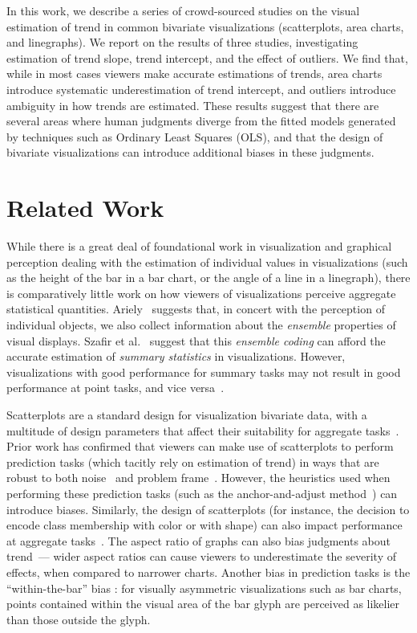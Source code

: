 \documentclass[chi_draft]{sigchi}
\begin{document}
In this work, we describe a series of crowd-sourced studies on the visual estimation of trend in common bivariate visualizations (scatterplots, area charts, and linegraphs). We report on the results of three studies, investigating estimation of trend slope, trend intercept, and the effect of outliers. We find that, while in most cases viewers make accurate estimations of trends, area charts introduce systematic underestimation of trend intercept, and outliers introduce ambiguity in how trends are estimated. These results suggest that there are several areas where human judgments diverge from the fitted models generated by techniques such as Ordinary Least Squares (OLS), and that the design of bivariate visualizations can introduce additional biases in these judgments.

\section{Related Work}

While there is a great deal of foundational work in visualization and graphical perception dealing with the estimation of individual values in visualizations (such as the height of the bar in a bar chart, or the angle of a line in a linegraph), there is comparatively little work on how viewers of visualizations perceive aggregate statistical quantities. Ariely~\cite{ariely2001seeing} suggests that, in concert with the perception of individual objects, we also collect information about the \emph{ensemble} properties of visual displays. Szafir et al.~\cite{szafir2016four} suggest that this \emph{ensemble coding} can afford the accurate estimation of \emph{summary statistics} in visualizations. However, visualizations with good performance for summary tasks may not result in good performance at point tasks, and vice versa~\cite{albers2014task,fuchs2013evaluation}. 

Scatterplots are a standard design for visualization bivariate data, with a multitude of design parameters that affect their suitability for aggregate tasks~\cite{cleveland1984many}. Prior work has confirmed that viewers can make use of scatterplots to perform prediction tasks (which tacitly rely on estimation of trend) in ways that are robust to both noise~\cite{harvey1997effects} and problem frame~\cite{lewandowsky2011popular}. However, the heuristics used when performing these prediction tasks (such as the anchor-and-adjust method~\cite{bolger1993context}) can introduce biases. Similarly, the design of scatterplots (for instance, the decision to encode class membership with color or with shape) can also impact performance at aggregate tasks~\cite{gleicher2013perception,lewandowsky1989discriminating}. The aspect ratio of graphs can also bias judgments about trend~\cite{beattie2002impact}--- wider aspect ratios can cause viewers to underestimate the severity of effects, when compared to narrower charts. Another bias in prediction tasks is the ``within-the-bar'' bias \cite{newman2012bar}: for visually asymmetric visualizations such as bar charts, points contained within the visual area of the bar glyph are perceived as likelier than those outside the glyph. 
\end{document}
